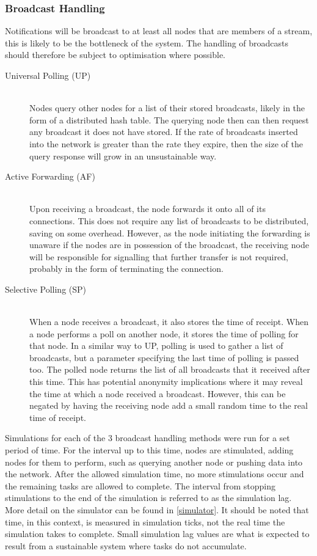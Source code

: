 		\subsubsection{Broadcast Handling}
			Notifications will be broadcast to at least all nodes that are members of a stream, this is likely to be the bottleneck of the system. The handling of broadcasts should therefore be subject to optimisation where possible.
			
			\begin{description}
				\item[Universal Polling (UP)] \hfill \\
				Nodes query other nodes for a list of their stored broadcasts, likely in the form of a distributed hash table. The querying node then can then request any broadcast it does not have stored. If the rate of broadcasts inserted into the network is greater than the rate they expire, then the size of the query response will grow in an unsustainable way.
				\item[Active Forwarding (AF)] \hfill \\
				Upon receiving a broadcast, the node forwards it onto all of its connections. This does not require any list of broadcasts to be distributed, saving on some overhead. However, as the node initiating the forwarding is unaware if the nodes are in possession of the broadcast, the receiving node will be responsible for signalling that further transfer is not required, probably in the form of terminating the connection.
				\item[Selective Polling (SP)] \hfill \\
				When a node receives a broadcast, it also stores the time of receipt. When a node performs a poll on another node, it stores the time of polling for that node. In a similar way to UP, polling is used to gather a list of broadcasts, but a parameter specifying the last time of polling is passed too. The polled node returns the list of all broadcasts that it received after this time. This has potential anonymity implications where it may reveal the time at which a node received a broadcast. However, this can be negated by having the receiving node add a small random time to the real time of receipt.				
			\end{description}
			
			Simulations for each of the 3 broadcast handling methods were run for a set period of time. For the interval up to this time, nodes are stimulated, adding nodes for them to perform, such as querying another node or pushing data into the network. After the allowed simulation time, no more stimulations occur and the remaining tasks are allowed to complete. The interval from stopping stimulations to the end of the simulation is referred to as the simulation lag. More detail on the simulator can be found in \ref{simulator}.  It should be noted that time, in this context, is measured in simulation ticks, not the real time the simulation takes to complete. Small simulation lag values are what is expected to result from a sustainable system where tasks do not accumulate.
			
